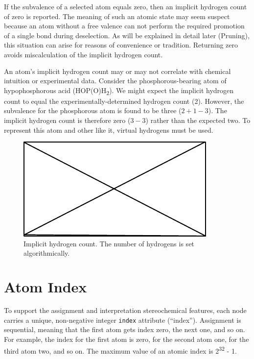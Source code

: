 \documentclass{article}
\def\ttt{\texttt}
\begin{document}
If the subvalence of a selected atom equals zero, then an implicit hydrogen count of zero is reported. The meaning of such an atomic state may seem suspect because an atom without a free valence can not perform the required promotion of a single bond during deselection. As will be explained in detail later (Pruning), this situation can arise for reasons of convenience or tradition. Returning zero avoids miscalculation of the implicit hydrogen count.

An atom's implicit hydrogen count may or may not correlate with chemical intuition or experimental data. Consider the phosphorous-bearing atom of hypophosphorous acid (HOP(O)H\textsubscript{2}). We might expect the implicit hydrogen count to equal the experimentally-determined hydrogen count (2). However, the subvalence for the phosphorous atom is found to be three ($2 + 1 - 3$). The implicit hydrogen count is therefore zero ($3 - 3$) rather than the expected two. To represent this atom and other like it, virtual hydrogens must be used.

\begin{figure}
    \centering
    \includegraphics{filler}
    \caption{Implicit hydrogen count. The number of hydrogens is set algorithmically.}
    \label{fig:implicit-hydrogen-count}
\end{figure}

\section*{Atom Index}

To support the assignment and interpretation stereochemical features, each node carries a unique, non-negative integer \ttt{index} attribute (\enquote{index}). Assignment is sequential, meaning that the first atom gets index zero, the next one, and so on. For example, the index for the first atom is zero, for the second atom one, for the third atom two, and so on. The maximum value of an atomic index is 2\textsuperscript{32} - 1.
\end{document}
